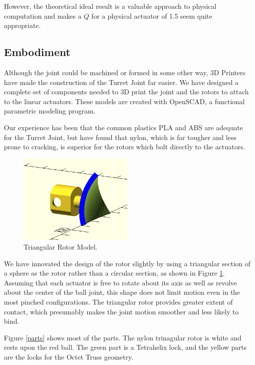 \documentclass[11pt]{article}
\begin{document}
 However, the theoretical ideal result is a valuable approach to physical computation and makes a $Q$ for a physical actuator of 1.5 seem quite appropriate.

 \subsection{Embodiment}

 Although the joint could be machined or formed in some other way,
 3D Printers have made the construction of the Turret Joint far easier.
 We have designed a complete set of components needed to 3D print the joint and the rotors to attach to
 the linear actuators. These models are created with OpenSCAD, a functional parametric modeling program.

 Our experience has been that the common plastics PLA and ABS are adequate for the Turret Joint,
 but have found that nylon, which is far tougher and less prone to cracking, is superior for the
 rotors which bolt directly to the actuators.

 \begin{figure}[!ht]
  \centering
    \includegraphics[width=0.5\textwidth]{figureslowres/RotorModel.png}
    \caption[Triangular Rotor Model]{Triangular Rotor Model.}
      \label{rotormodel}
\end{figure}

 We have innovated the design of the rotor slightly by using a triangular section of a sphere as the
 rotor rather than a circular section, as shown in Figure \ref{rotormodel}.
 Assuming that each actuator is free to rotate about its axis as well as revolve about the
 center of the ball joint, this shape does not limit motion even in the most pinched
 configurations. The triangular rotor provides greater extent of contact,
 which presumably makes the joint motion
 smoother and less likely to bind.
 

 Figure \ref{parts} shows most of the parts. The nylon trinagular rotor is white and rests upon
 the red ball. The green part is a Tetrahelix lock, and the yellow parts are the locks for the Octet Truss
 geometry.
\end{document}
